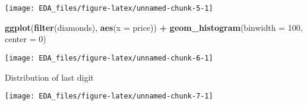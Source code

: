 \documentclass[]{book}
\newenvironment{Shaded}{\begin{snugshade}}{\end{snugshade}}
\newcommand{\DataTypeTok}[1]{\textcolor[rgb]{0.13,0.29,0.53}{#1}}
\newcommand{\DecValTok}[1]{\textcolor[rgb]{0.00,0.00,0.81}{#1}}
\newcommand{\KeywordTok}[1]{\textcolor[rgb]{0.13,0.29,0.53}{\textbf{#1}}}
\newcommand{\NormalTok}[1]{#1}
\newcommand{\OperatorTok}[1]{\textcolor[rgb]{0.81,0.36,0.00}{\textbf{#1}}}
\newcommand{\StringTok}[1]{\textcolor[rgb]{0.31,0.60,0.02}{#1}}
\theoremstyle{definition}
\theoremstyle{definition}
\theoremstyle{definition}
\theoremstyle{remark}
\begin{document}
\begin{center}\texttt{[image: EDA\_files/figure-latex/unnamed-chunk-5-1]} \end{center}

\begin{Shaded}
\begin{Highlighting}[]
\KeywordTok{ggplot}\NormalTok{(}\KeywordTok{filter}\NormalTok{(diamonds), }\KeywordTok{aes}\NormalTok{(}\DataTypeTok{x =}\NormalTok{ price)) }\OperatorTok{+}
\StringTok{  }\KeywordTok{geom_histogram}\NormalTok{(}\DataTypeTok{binwidth =} \DecValTok{100}\NormalTok{, }\DataTypeTok{center =} \DecValTok{0}\NormalTok{)}
\end{Highlighting}
\end{Shaded}

\begin{center}\texttt{[image: EDA\_files/figure-latex/unnamed-chunk-6-1]} \end{center}

Distribution of last digit

\begin{Shaded}
\end{Shaded}

\begin{center}\texttt{[image: EDA\_files/figure-latex/unnamed-chunk-7-1]} \end{center}

\begin{Shaded}
\end{Shaded}
\end{document}
